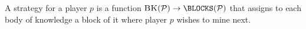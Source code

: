 \documentclass{article}
\begin{document}
A strategy for a player $p$ is a function $\BK(\cP) \rightarrow \BLOCKS(\cP)$ that assigns to each body of knowledge a block of it 
where player $p$ wishes to mine next. 


%


%


%
%
%
%

%
%
%
%
%
%
%
%

%

%

%


%
%

%
\end{document}
